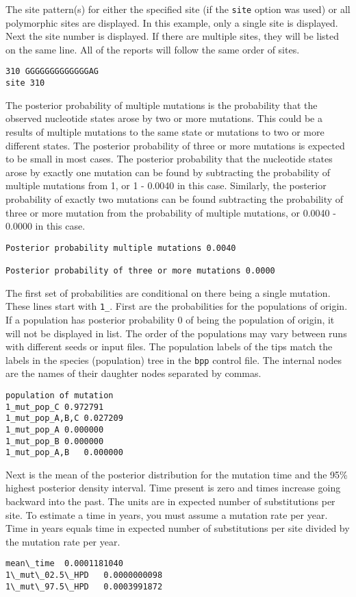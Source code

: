 \documentclass[11pt]{article}
\begin{document}
The site pattern(s) for either the specified site (if the \texttt{site} option was used) or all polymorphic sites are displayed. 
In this example, only a single site is displayed.
Next the site number is displayed. If there are multiple sites, they will be listed on the same line. 
All of the reports will follow the same order of sites.
\begin{Verbatim}[frame=single, fontsize=\small]
310 GGGGGGGGGGGGGAG
site 310	
\end{Verbatim}

The posterior probability of multiple mutations is the probability that the observed nucleotide states arose by two or more mutations. 
This could be a results of multiple mutations to the same state or mutations to two or more different states.
The posterior probability of three or more mutations is expected to be small in most cases. 
The posterior probability that the nucleotide states arose by exactly one mutation can be found by subtracting the probability of multiple mutations from 1, or 1 - 0.0040 in this case. 
Similarly, the posterior probability of exactly two mutations can be found subtracting the probability of three or more mutation from the probability of multiple mutations, or 0.0040 - 0.0000 in this case.
\begin{Verbatim}[frame=single, fontsize=\small]
Posterior probability multiple mutations 0.0040
		
Posterior probability of three or more mutations 0.0000
\end{Verbatim}

The first set of probabilities are conditional on there being a single mutation.
These lines start with \texttt{1\_}.
First are the probabilities for the populations of origin. 
If a population has posterior probability 0 of being the population of origin, it will not be displayed in list. 
The order of the populations may vary between runs with different seeds or input files. 
The population labels of the tips match the labels in the species (population) tree in the \texttt{bpp} control file. 
The internal nodes are the names of their daughter nodes separated by commas.
\begin{Verbatim}[frame=single, fontsize=\small]
population of mutation
1_mut_pop_C	0.972791	
1_mut_pop_A,B,C	0.027209	
1_mut_pop_A	0.000000	
1_mut_pop_B	0.000000	
1_mut_pop_A,B	0.000000
\end{Verbatim}

Next is the mean of the posterior distribution for the mutation time and the 95\% highest posterior density interval. 
Time present is zero and times increase going backward into the past. 
The units are in expected number of substitutions per site. 
To estimate a time in years, you must assume a mutation rate per year. 
Time in years equals time in expected number of substitutions per site divided by the mutation rate per year.
\begin{Verbatim}[frame=single, fontsize=\small]
mean\_time	0.0001181040	
1\_mut\_02.5\_HPD	0.0000000098	
1\_mut\_97.5\_HPD	0.0003991872
\end{Verbatim}
\end{document}
